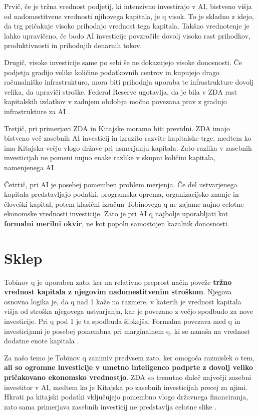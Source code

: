 \documentclass[12pt,a4paper]{article}
\begin{document}
Prvič, če je tržna vrednost podjetij, ki intenzivno investirajo v AI, bistveno višja od nadomestitvene vrednosti njihovega kapitala, je q visok. To je skladno z idejo, da trg pričakuje visoko prihodnjo vrednost tega kapitala. Takšno vrednotenje je lahko upravičeno, če bodo AI investicije povzročile dovolj visoko rast prihodkov, produktivnosti in prihodnjih denarnih tokov.

Drugič, visoke investicije same po sebi še ne dokazujejo visoke donosnosti. Če podjetja gradijo velike količine podatkovnih centrov in kupujejo drago računalniško infrastrukturo, mora biti prihodnja uporaba te infrastrukture dovolj velika, da upraviči stroške. Federal Reserve ugotavlja, da je bila v ZDA rast kapitalskih izdatkov v zadnjem obdobju močno povezana prav z gradnjo infrastrukture za AI \citep{FederalReserve2026}.

Tretjič, pri primerjavi ZDA in Kitajske moramo biti previdni. ZDA imajo bistveno več zasebnih AI investicij in izrazito razvite kapitalske trge, medtem ko ima Kitajska večjo vlogo države pri usmerjanju kapitala. Zato razlika v zasebnih investicijah ne pomeni nujno enake razlike v skupni količini kapitala, namenjenega AI.

Četrtič, pri AI je posebej pomemben problem merjenja. Če del ustvarjenega kapitala predstavljajo podatki, programska oprema, organizacijsko znanje in človeški kapital, potem klasični izračun Tobinovega q ne zajame nujno celotne ekonomske vrednosti investicije. Zato je pri AI q najbolje uporabljati kot \textbf{formalni merilni okvir}, ne kot popoln samostojen kazalnik donosnosti.


\section{Sklep}

Tobinov q je uporaben zato, ker na relativno preprost način poveže \textbf{tržno vrednost kapitala z njegovim nadomestitvenim stroškom}. Njegova osnovna logika je, da q nad 1 kaže na razmere, v katerih je vrednost kapitala višja od stroška njegovega ustvarjanja, kar je povezano z večjo spodbudo za nove investicije. Pri q pod 1 je ta spodbuda šibkejša. Formalna povezava med q in investicijami je posebej pomembna pri marginalnem q, ki se nanaša na vrednost dodatne enote kapitala \citep{AndreiMannMoyen2017,PetersTaylor2016}.

Za našo temo je Tobinov q zanimiv predvsem zato, ker omogoča razmislek o tem, \textbf{ali so ogromne investicije v umetno inteligenco podprte z dovolj veliko pričakovano ekonomsko vrednostjo}. ZDA so trenutno daleč največji zasebni investitor v AI, medtem ko je Kitajska po zasebnih investicijah precej za njimi. Hkrati pa kitajski podatki vključujejo pomembno vlogo državnega financiranja, zato sama primerjava zasebnih investicij ne predstavlja celotne slike \citep{StanfordAIIndex2026}.
\end{document}
